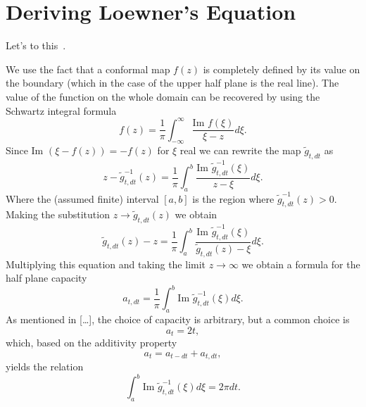 \chapter{Deriving Loewner's Equation}
\label{sub:proof}

Let's to this~\cite{Kager2004, delMonaco2013}.

We use the fact that a conformal map $f(z)$ is completely defined by its value
on the boundary (which in the case of the upper half plane is the real line).
The value of the function on the whole domain can be recovered by using the
Schwartz integral formula
\begin{equation}
    f\left(z\right)=
    \frac{1}{\pi}\int_{-\infty}^{\infty}
    \frac{\mbox{Im }f\left(\xi\right)}{\xi-z}d\xi.
\end{equation}
Since $\mbox{Im }(\xi - f(z))=-f(z)$ for $\xi$ real we can rewrite the
map $\tilde{g}_{t,dt}$ as
\begin{equation}
    z-\tilde{g}_{t,dt}^{-1}\left(z\right)=
    \frac{1}{\pi}\int_{a}^{b}
    \frac{\mbox{Im }\tilde{g}_{t,dt}^{-1}\left(\xi\right)}{z-\xi}d\xi.
\end{equation}
Where the (assumed finite) interval $[a,b]$ is the region where
$\tilde{g}_{t,dt}^{-1}(z)>0$. Making the substitution $z\rightarrow\tilde{g}_{t,dt}(z)$
we obtain
\begin{equation}
    \label{eq:proof1}
    \tilde{g}_{t,dt}\left(z\right)-z=
    \frac{1}{\pi}\int_{a}^{b}
    \frac{\mbox{Im }\tilde{g}_{t,dt}^{-1}\left(\xi\right)}
    {\tilde{g}_{t,dt}\left(z\right)-\xi}d\xi.
\end{equation}
Multiplying this equation and taking the limit $z\rightarrow\infty$ we
obtain a formula for the half plane capacity
\begin{equation}
    a_{t,dt}=\frac{1}{\pi}\int_{a}^{b}
    \mbox{Im }\tilde{g}_{t,dt}^{-1}\left(\xi\right)d\xi.
\end{equation}
As mentioned in [\ldots], the choice of capacity is arbitrary, but a common
choice is
\begin{equation}
    a_t = 2t,
\end{equation}
which, based on the additivity property
\begin{equation}
    a_t = a_{t-dt} + a_{t,dt},
\end{equation}
yields the relation
\begin{equation}
    \label{eq:proof2}
    \int_{a}^{b}\mbox{Im }\tilde{g}_{t,dt}^{-1}\left(\xi\right)d\xi=2\pi dt.
\end{equation}

